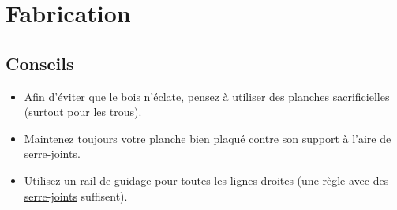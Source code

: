\documentclass[a4paper,oneside]{article}
\begin{document}
\newpage

\section{Fabrication}

\subsection{Conseils}
\begin{itemize}
\item Afin d'éviter que le bois n'éclate, pensez à utiliser des planches sacrificielles (surtout pour les trous).
\item Maintenez toujours votre planche bien plaqué contre son support à l'aire de \href{http://www.leroymerlin.fr/v3/p/produits/serre-joint-1-main-dexter-300-mm-e51423}{serre-joints}.
\item Utilisez un rail de guidage pour toutes les lignes droites (une \href{http://www.leroymerlin.fr/v3/p/produits/regle-avec-embout-nespoli-150-cm-e67206}{règle} avec des \href{http://www.leroymerlin.fr/v3/p/produits/lot-de-serre-joints-a-cadre-5-mm-e51365}{serre-joints} suffisent).
\end{itemize}
\end{document}
